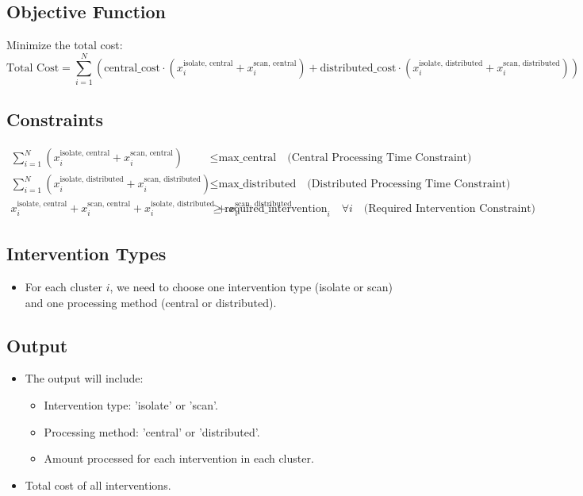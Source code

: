 \documentclass{article}
\begin{document}
\subsection*{Objective Function}
Minimize the total cost:
\[
\text{Total Cost} = \sum_{i=1}^{N} \left( \text{central\_cost} \cdot (x_{i}^{\text{isolate, central}} + x_{i}^{\text{scan, central}}) + \text{distributed\_cost} \cdot (x_{i}^{\text{isolate, distributed}} + x_{i}^{\text{scan, distributed}}) \right)
\]

\subsection*{Constraints}
\begin{align}
\sum_{i=1}^{N} (x_{i}^{\text{isolate, central}} + x_{i}^{\text{scan, central}}) & \leq \text{max\_central} \quad \text{(Central Processing Time Constraint)} \\
\sum_{i=1}^{N} (x_{i}^{\text{isolate, distributed}} + x_{i}^{\text{scan, distributed}}) & \leq \text{max\_distributed} \quad \text{(Distributed Processing Time Constraint)} \\
x_{i}^{\text{isolate, central}} + x_{i}^{\text{scan, central}} + x_{i}^{\text{isolate, distributed}} + x_{i}^{\text{scan, distributed}} & \geq \text{required\_intervention}_{i} \quad \forall i \quad \text{(Required Intervention Constraint)}
\end{align}

\subsection*{Intervention Types}
\begin{itemize}
    \item For each cluster \( i \), we need to choose one intervention type (isolate or scan) and one processing method (central or distributed).
\end{itemize}

\subsection*{Output}
\begin{itemize}
    \item The output will include:
        \begin{itemize}
            \item Intervention type: 'isolate' or 'scan'.
            \item Processing method: 'central' or 'distributed'.
            \item Amount processed for each intervention in each cluster.
        \end{itemize}
    \item Total cost of all interventions.
\end{itemize}
\end{document}
